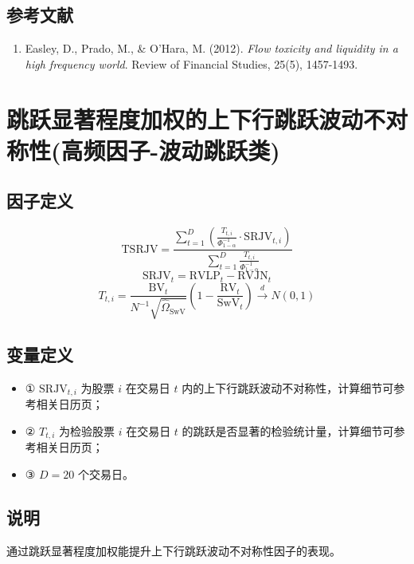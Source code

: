 \documentclass{article}
\begin{document}
\subsection{参考文献}
\begin{enumerate}
    \item Easley, D., Prado, M., \& O'Hara, M. (2012). \textit{Flow toxicity and liquidity in a high frequency world}. Review of Financial Studies, 25(5), 1457-1493.
\end{enumerate}

\section{跳跃显著程度加权的上下行跳跃波动不对称性(高频因子-波动跳跃类)}

\subsection{因子定义}
\begin{equation}
    \mathrm{TSRJV} = \frac{\sum_{t=1}^{D} \left( \frac{T_{t,i}}{\Phi^{-1}_{1-\alpha}} \cdot \mathrm{SRJV}_{t,i} \right)}{\sum_{t=1}^{D} \frac{T_{t,i}}{\Phi^{-1}_{1-\alpha}}}
\end{equation}
\begin{equation}
    \mathrm{SRJV}_t = \mathrm{RVLP}_t - \mathrm{RVJN}_t
\end{equation}
\begin{equation}
    T_{t,i} = \frac{\mathrm{BV}_t}{N^{-1}\sqrt{\hat{\Omega}_{\mathrm{SwV}}}} \left(1 - \frac{\mathrm{RV}_t}{\mathrm{SwV}_t}\right) \xrightarrow{d} N(0, 1)
\end{equation}

\subsection{变量定义}
\begin{itemize}
    \item ① \( \mathrm{SRJV}_{t,i} \) 为股票 \( i \) 在交易日 \( t \) 内的上下行跳跃波动不对称性，计算细节可参考相关日历页；
    \item ② \( T_{t,i} \) 为检验股票 \( i \) 在交易日 \( t \) 的跳跃是否显著的检验统计量，计算细节可参考相关日历页；
    \item ③ \( D = 20 \) 个交易日。
\end{itemize}

\subsection{说明}
通过跳跃显著程度加权能提升上下行跳跃波动不对称性因子的表现。
\end{document}
